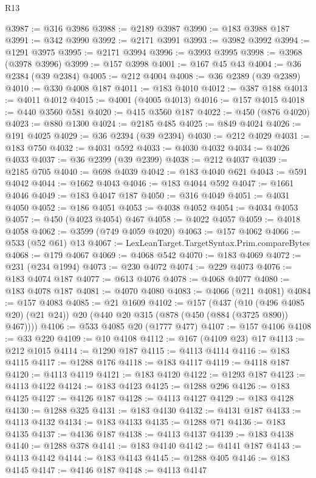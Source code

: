 \begin{lexlean}{R13}
\begin{coremodule}
@3987 := @316 @3986
@3988 := @2189 @3987
@3990 := @183 @3988 @187
@3991 := @342 @3990
@3992 := @2171 @3991
@3993 := @3982 @3992
@3994 := @1291 @3975
@3995 := @2171 @3994
@3996 := @3993 @3995
@3998 := @3968 (@3978 @3996)
@3999 := @157 @3998
@4001 := @167 @45 @43
@4004 := @36 @2384 (@39 @2384)
@4005 := @212 @4004
@4008 := @36 @2389 (@39 @2389)
@4010 := @330 @4008 @187
@4011 := @183 @4010
@4012 := @387 @188
@4013 := @4011 @4012
@4015 := @4001 (@4005 @4013)
@4016 := @157 @4015
@4018 := @440 @3560 @581
@4020 := @415 @3560 @187
@4022 := @450 (@876 @4020)
@4023 := @880 @1300
@4024 := @2185 @485
@4025 := @849 @4024
@4026 := @191 @4025
@4029 := @36 @2394 (@39 @2394)
@4030 := @212 @4029
@4031 := @183 @750
@4032 := @4031 @592
@4033 := @4030 @4032
@4034 := @4026 @4033
@4037 := @36 @2399 (@39 @2399)
@4038 := @212 @4037
@4039 := @2185 @705
@4040 := @698 @4039
@4042 := @183 @4040 @621
@4043 := @591 @4042
@4044 := @1662 @4043
@4046 := @183 @4044 @592
@4047 := @1661 @4046
@4049 := @183 @4047 @187
@4050 := @316 @4049
@4051 := @4031 @4050
@4052 := @186 @4051
@4053 := @4038 @4052
@4054 := @4034 @4053
@4057 := @450 (@4023 @4054) @467
@4058 := @4022 @4057
@4059 := @4018 @4058
@4062 := @3599 (@749 @4059 @4020)
@4063 := @157 @4062
@4066 := @533 (@52 @61) @13
@4067 := LexLeanTarget.TargetSyntax.Prim.compareBytes
@4068 := @179 @4067
@4069 := @4068 @542
@4070 := @183 @4069
@4072 := @231 (@234 @1994)
@4073 := @230 @4072
@4074 := @229 @4073
@4076 := @183 @4074 @187
@4077 := @613 @4076
@4078 := @4068 @4077
@4080 := @183 @4078 @187
@4081 := @4070 @4080
@4083 := @4066 (@211 @4081)
@4084 := @157 @4083
@4085 := @21 @1609
@4102 := @157
    (@437
      (@10 (@496 @4085 @20) (@21 @24))
      @20
      (@440 @20 @315 (@878 (@450 (@884 (@3725 @890)) @467))))
@4106 := @533 @4085 @20 (@1777 @477)
@4107 := @157 @4106
@4108 := @33 @220
@4109 := @10 @4108
@4112 := @167 (@4109 @23) @17
@4113 := @212 @1015
@4114 := @1290 @187
@4115 := @4113 @4114
@4116 := @183 @4115
@4117 := @1288 @176
@4118 := @183 @4117
@4119 := @4118 @187
@4120 := @4113 @4119
@4121 := @183 @4120
@4122 := @1293 @187
@4123 := @4113 @4122
@4124 := @183 @4123
@4125 := @1288 @296
@4126 := @183 @4125
@4127 := @4126 @187
@4128 := @4113 @4127
@4129 := @183 @4128
@4130 := @1288 @325
@4131 := @183 @4130
@4132 := @4131 @187
@4133 := @4113 @4132
@4134 := @183 @4133
@4135 := @1288 @71
@4136 := @183 @4135
@4137 := @4136 @187
@4138 := @4113 @4137
@4139 := @183 @4138
@4140 := @1288 @378
@4141 := @183 @4140
@4142 := @4141 @187
@4143 := @4113 @4142
@4144 := @183 @4143
@4145 := @1288 @405
@4146 := @183 @4145
@4147 := @4146 @187
@4148 := @4113 @4147

\end{coremodule}
\end{lexlean}
